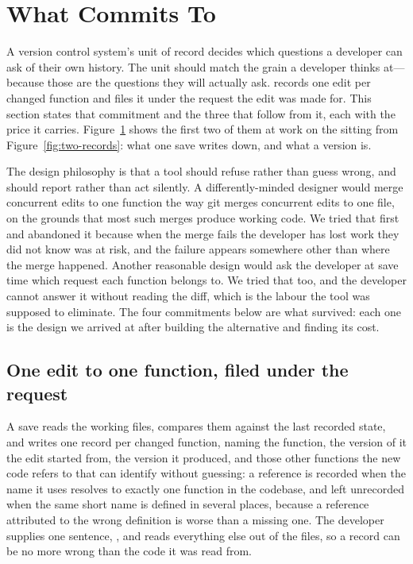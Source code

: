 \section{What \sgt{} Commits To}
\label{sec:design}

\begin{figure}[t]
  \centering
  
  \Description{\FigThreeDescription}
  \caption{\FigThreeCaption}
  \label{fig:model}
\end{figure}

A version control system's unit of record decides which questions a developer can
ask of their own history. The unit should match the grain a developer thinks
at---because those are the questions they will actually ask. \sgt{} records one edit per changed function
and files it under the request the edit was made for. This section states that
commitment and the three that follow from it, each with the price it carries.
Figure~\ref{fig:model} shows the first two of them at work on the sitting from
Figure~\ref{fig:two-records}: what one save writes down, and what a version is.

The design philosophy is that a tool should refuse rather than guess wrong, and
should report rather than act silently. A differently-minded designer would merge
concurrent edits to one function the way git merges concurrent edits to one file,
on the grounds that most such merges produce working code. We tried that first and
abandoned it because when the merge fails the developer has lost work they did not
know was at risk, and the failure appears somewhere other than where the merge
happened. Another reasonable design would ask the developer at save time which
request each function belongs to. We tried that too, and the developer cannot
answer it without reading the diff, which is the labour the tool was supposed to
eliminate. The four commitments below are what survived: each one is the design we
arrived at after building the alternative and finding its cost.

\subsection{One edit to one function, filed under the request}
\label{sec:grain}

A save reads the working files, compares them against the last recorded state, and
writes one record per changed function, naming the function, the version of it the
edit started from, the version it produced, and those other functions the new code
refers to that \sgt{} can identify without guessing: a reference is recorded when the
name it uses resolves to exactly one function in the codebase, and left unrecorded
when the same short name is defined in several places, because a reference attributed
to the wrong definition is worse than a missing one. The developer supplies one sentence,
, and \sgt{} reads
everything else out of the files, so a record can be no more wrong than the code it
was read from.

